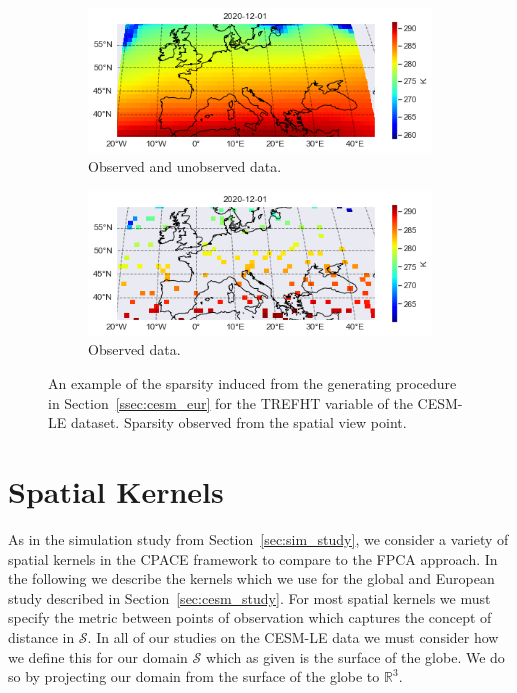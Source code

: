 \begin{figure}
	\centering
	\begin{subfigure}[b]{0.45\textwidth}
		\includegraphics[width=\textwidth]{eur_sparse_full}
		\caption{Observed and unobserved data.}
	\end{subfigure}
	\hfill        
	\begin{subfigure}[b]{0.45\textwidth}
		\includegraphics[width=\textwidth]{eur_sparse_train}
		\caption{Observed data.}
	\end{subfigure}
	\caption[An example of the sparsity induced from the  generating procedure in Section~\ref{ssec:cesm_eur} for the TREFHT variable of the CESM-LE dataset.]{An example of the sparsity induced from the  generating procedure in Section~\ref{ssec:cesm_eur} for the TREFHT variable of the CESM-LE dataset. Sparsity observed from the spatial view point.}
	\label{fig:cesm_sparsity_eur}
\end{figure}


\section{Spatial Kernels \label{sec:cesm_kernels}}
As in the simulation study from Section~\ref{sec:sim_study}, we consider a variety of spatial kernels in the CPACE framework to compare to the FPCA approach.
In the following we describe the kernels which we use for the global and European study described in Section~\ref{sec:cesm_study}.
For most spatial kernels we must specify the metric between points of observation which captures the concept of distance in $\mathcal{S}$.
In all of our studies on the CESM-LE data we must consider how we define this for our domain $\mathcal{S}$ which as given is the surface of the globe.
We do so by projecting our domain from the surface of the globe to $\mathbb{R}^{3}$. 

